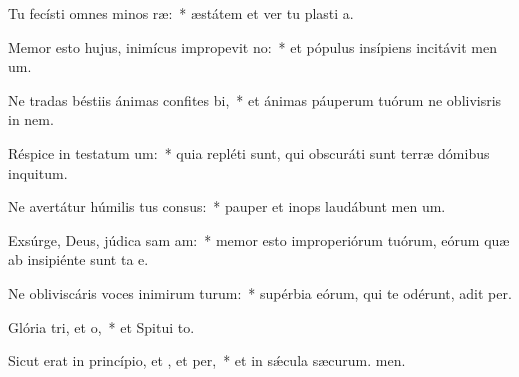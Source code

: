 \item Tu fecísti omnes minos ræ:~* æstátem et ver tu plasti a.
\item Memor esto hujus, inimícus impropevit no:~* et pópulus insípiens incitávit men um.
\item Ne tradas béstiis ánimas confites bi,~* et ánimas páuperum tuórum ne oblivisris in nem.
\item Réspice in testatum um:~* quia repléti sunt, qui obscuráti sunt terræ dómibus inquitum.
\item Ne avertátur húmilis tus consus:~* pauper et inops laudábunt men um.
\item Exsúrge, Deus, júdica sam am:~* memor esto improperiórum tuórum, eórum quæ ab insipiénte sunt ta e.
\item Ne obliviscáris voces inimirum turum:~* supérbia eórum, qui te odérunt, adit per.
\item Glória tri, et o,~* et Spitui to.
\item Sicut erat in princípio, et , et per,~* et in sǽcula sæcurum. men.
